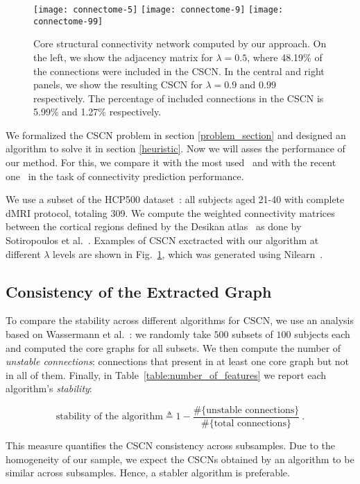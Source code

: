 \begin{figure}\center%
  \texttt{[image: connectome-5]}
  \texttt{[image: connectome-9]}
  \texttt{[image: connectome-99]}
  \caption{Core structural connectivity network computed by our approach. On the left, we show the adjacency matrix for $\lambda = 0.5$, where 48.19\% of the connections were included in the CSCN. In the central and right panels, we show the resulting CSCN for $\lambda=0.9$ and $0.99$ respectively. The percentage of included connections in the CSCN is 5.99\% and 1.27\% respectively.\label{fig:connectome}}
  
\end{figure}

We formalized the CSCN problem in section \ref{problem_section} and designed an algorithm to solve it in section \ref{heuristic}. Now we will asses the performance of our method. For this, we compare it with the most used~\cite{Gong2009} and with the recent one~\cite{Wassermann2016} in the task of connectivity prediction performance.

We use a subset of the HCP500 dataset~\cite{Sotiropoulos2013}: all subjects aged 21-40 with complete dMRI protocol, totaling 309. We compute the weighted connectivity matrices between the cortical regions defined by the Desikan atlas~\cite{Desikan2006} as done by Sotiropoulos et al.~\cite{Sotiropoulos2013}.
Examples of CSCN exctracted with our algorithm at different $\lambda$ levels are shown in Fig.~\ref{fig:connectome}, which was generated using Nilearn~\cite{Abraham2014}.

\subsection{Consistency of the Extracted Graph}
To compare the stability across different algorithms for CSCN, we use an analysis based on Wassermann et al.~\cite{Wassermann2016}: we randomly take $500$ subsets of $100$ subjects each and computed the core graphs for all subsets. We then compute the number of \emph{unstable connections}: connections that present in at least one core graph but not in all of them. Finally, in Table~\ref{table:number_of_features} we report each algorithm's \emph{stability}: 

$$\text{stability of the algorithm} \triangleq 1 - \frac{\#\{\text{unstable connections}\}}{\#\{\text{total connections}\}}~.$$

This measure quantifies the CSCN consistency across subsamples. Due to the homogeneity of our sample, we expect the CSCNs obtained by an algorithm to be similar across subsamples. Hence, a stabler algorithm is preferable.

